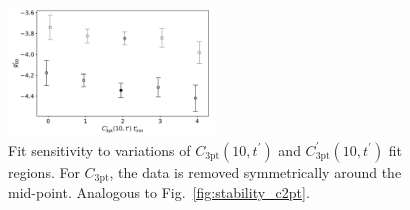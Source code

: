 \documentclass[prd,aps,twocolumn,superscriptaddress,tightenlines,nofootinbib,floatfix,preprintnumbers,10pt]{revtex4-1}
\begin{document}
\begin{figure}[h]
{		\includegraphics[width=0.49\textwidth]{plots/figures/3296_dgV10_dgV.pdf}
		\caption{
			Fit sensitivity to variations of $C_{\mathrm{3pt}}(10,t^\prime)$ and $C^\prime_{\mathrm{3pt}}(10,t^\prime)$ fit regions. For $C_{\mathrm{3pt}}$, the data is removed symmetrically around the mid-point. Analogous to Fig.~\ref{fig:stability_c2pt}.}
		\label{fig:stability_c3pt10}
}\end{figure}

\clearpage
\newpage
\end{document}
